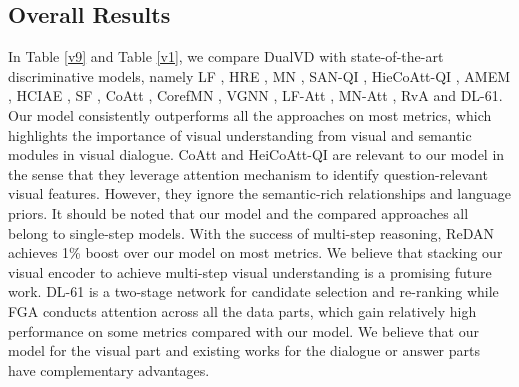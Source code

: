 \documentclass[letterpaper]{article} \usepackage{aaai20}  \usepackage{times}  \usepackage{helvet} \usepackage{courier}  \usepackage[hyphens]{url}  \usepackage{graphicx} \urlstyle{rm} \def\UrlFont{\rm}  \usepackage{graphicx}  \frenchspacing  \setlength{\pdfpagewidth}{8.5in}  \setlength{\pdfpageheight}{11in}  \usepackage{mathrsfs} \usepackage{amsfonts,amssymb}  \usepackage{tabularx} \usepackage{url}
\begin{document}
\subsection{Overall Results}

In Table \ref{v9} and Table \ref{v1}, we compare DualVD with state-of-the-art discriminative models, namely  LF \cite{Das2017Visual}, HRE \cite{Das2017Visual}, 
MN \cite{Das2017Visual}, SAN-QI \cite{YangZi2016Stacked}, HieCoAtt-QI \cite{Lu2016Hierarchical}, AMEM \cite{seo2017visual},  HCIAE \cite{lu2017best}, SF \cite{Jain2018Two}, CoAtt \cite{wu2018areyou}, CorefMN \cite{Kottur2018Visual}, VGNN \cite{Zheng2019Reasoning}, LF-Att \cite{Das2017Visual}, MN-Att \cite{Das2017Visual}, 
RvA\cite{Niu2018Recursive} and DL-61\cite{guo2019image}. Our model consistently outperforms all the approaches on most metrics, which highlights the importance of visual understanding from visual and semantic modules in visual dialogue. CoAtt and HeiCoAtt-QI are relevant to our model in the sense that they leverage attention mechanism to identify question-relevant visual features. However, they ignore the semantic-rich relationships and language priors. It should be noted that our model and the compared approaches all belong to single-step models. With the success of multi-step reasoning, ReDAN \cite{Gan2019Multi} achieves 1\% boost over our model on most metrics. We believe that stacking our visual encoder to achieve multi-step visual understanding is a promising future work. DL-61 \cite{guo2019image} is a two-stage network for candidate selection and re-ranking while FGA \cite{schwartz2019factor} conducts attention across all the data parts, which gain relatively high performance on some metrics compared with our model. We believe that our model for the visual part and existing works for the dialogue or answer parts have complementary advantages. 
\end{document}
